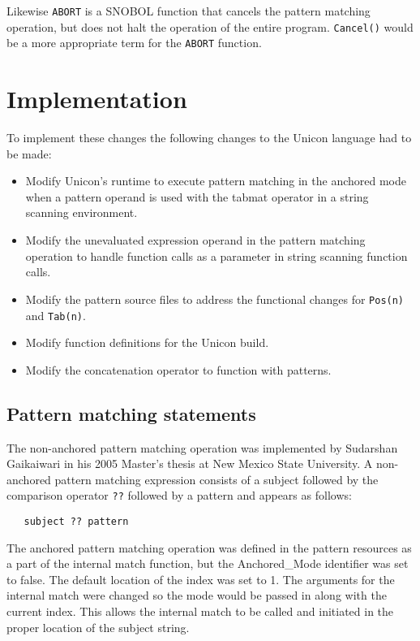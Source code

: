 \documentclass{article}
\begin{document}
Likewise \texttt{ABORT} is a SNOBOL function that cancels the pattern matching operation, but does not halt the operation of the entire program.  \texttt{Cancel()} would be a more appropriate term for the \texttt{ABORT} function.

\section{Implementation}
To implement these changes the following changes to the Unicon language had to be made:
\begin{itemize}
\item Modify Unicon's runtime to execute pattern matching in the anchored mode when a pattern operand is used with the tabmat operator in a string scanning environment.
\item Modify the unevaluated expression operand in the pattern matching operation to handle function calls as a parameter in string scanning function calls.
\item Modify the pattern source files to address the functional changes for \texttt{Pos(n)} and \texttt{Tab(n)}.
\item Modify function definitions for the Unicon build.
\item Modify the concatenation operator to function with patterns.
\end{itemize}

\subsection{Pattern matching statements}
The non-anchored pattern matching operation was implemented by Sudarshan Gaikaiwari in his 2005 Master's thesis at New Mexico State University.  A non-anchored pattern matching expression consists of a subject followed by the comparison operator \texttt{??} followed by a pattern and appears as follows:

\begin{verbatim}
   subject ?? pattern
\end{verbatim}

The anchored pattern matching operation was defined in the pattern resources as a part of the internal match function, but the Anchored\_Mode identifier was set to false.  The default location of the index was set to 1.  The arguments for the internal match were changed so the mode would be passed in along with the current index.  This allows the internal match to be called and initiated in the proper location of the subject string.
\end{document}
